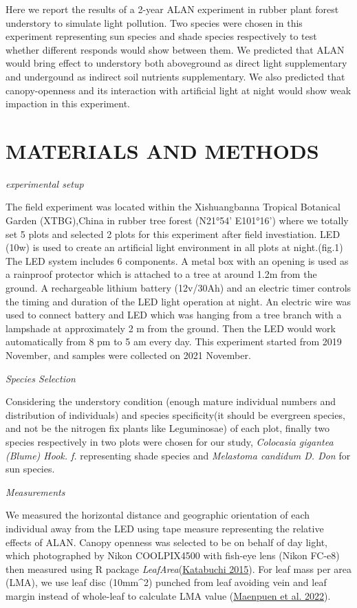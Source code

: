 \documentclass[
  letterpaper,
  DIV=11,
  numbers=noendperiod]{scrartcl}
\begin{document}
Here we report the results of a 2-year ALAN experiment in rubber plant
forest understory to simulate light pollution. Two species were chosen
in this experiment representing sun species and shade species
respectively to test whether different responds would show between them.
We predicted that ALAN would bring effect to understory both aboveground
as direct light supplementary and undergound as indirect soil nutrients
supplementary. We also predicted that canopy-openness and its
interaction with artificial light at night would show weak impaction in
this experiment.

\hypertarget{materials-and-methods}{%
\section{MATERIALS AND METHODS}\label{materials-and-methods}}

\emph{experimental setup}

The field experiment was located within the Xishuangbanna Tropical
Botanical Garden (XTBG),China in rubber tree forest (N21°54' E101°16')
where we totally set 5 plots and selected 2 plots for this experiment
after field investiation. LED (10w) is used to create an artificial
light environment in all plots at night.(fig.1) The LED system includes
6 components. A metal box with an opening is used as a rainproof
protector which is attached to a tree at around 1.2m from the ground. A
rechargeable lithium battery (12v/30Ah) and an electric timer controls
the timing and duration of the LED light operation at night. An electric
wire was used to connect battery and LED which was hanging from a tree
branch with a lampshade at approximately 2 m from the ground. Then the
LED would work automatically from 8 pm to 5 am every day. This
experiment started from 2019 November, and samples were collected on
2021 November.

\emph{Species Selection}

Considering the understory condition (enough mature individual numbers
and distribution of individuals) and species specificity(it should be
evergreen species, and not be the nitrogen fix plants like Leguminosae)
of each plot, finally two species respectively in two plots were chosen
for our study, \emph{Colocasia gigantea (Blume) Hook. f.} representing
shade species and \emph{Melastoma candidum D. Don} for sun species.

\emph{Measurements}

We measured the horizontal distance and geographic orientation of each
individual away from the LED using tape measure representing the
relative effects of ALAN. Canopy openness was selected to be on behalf
of day light, which photographed by Nikon COOLPIX4500 with fish-eye lens
(Nikon FC-e8) then measured using R package
\emph{LeafArea}(\protect\hyperlink{ref-Katabuchi2015}{Katabuchi 2015}).
For leaf mass per area (LMA), we use leaf disc (10mm\^{}2) punched from
leaf avoiding vein and leaf margin instead of whole-leaf to calculate
LMA value (\protect\hyperlink{ref-Maenpuen2022}{Maenpuen et al. 2022}).
\end{document}
